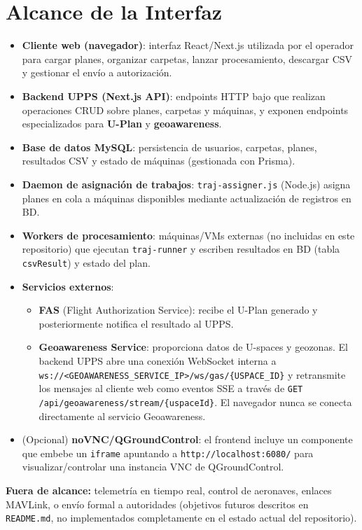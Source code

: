 \documentclass[12pt,a4paper]{article}
\newcommand{\icdendpoint}[1]{\begingroup\small\path{#1}\endgroup}
\begin{document}
\section{Alcance de la Interfaz}
\begin{itemize}
    \item \textbf{Cliente web (navegador)}: interfaz React/Next.js utilizada por el operador para cargar planes, organizar carpetas, lanzar procesamiento, descargar CSV y gestionar el envío a autorización.
    \item \textbf{Backend UPPS (Next.js API)}: endpoints HTTP bajo \icdendpoint{/api/*} que realizan operaciones CRUD sobre planes, carpetas y máquinas, y exponen endpoints especializados para \textbf{U-Plan} y \textbf{geoawareness}.
    \item \textbf{Base de datos MySQL}: persistencia de usuarios, carpetas, planes, resultados CSV y estado de máquinas (gestionada con Prisma).
    \item \textbf{Daemon de asignación de trabajos}: \texttt{traj-assigner.js} (Node.js) asigna planes en cola a máquinas disponibles mediante actualización de registros en BD.
    \item \textbf{Workers de procesamiento}: máquinas/VMs externas (no incluidas en este repositorio) que ejecutan \texttt{traj-runner} y escriben resultados en BD (tabla \texttt{csvResult}) y estado del plan.
    \item \textbf{Servicios externos}:
    \begin{itemize}
        \item \textbf{FAS} (Flight Authorization Service): recibe el U-Plan generado y posteriormente notifica el resultado al UPPS.
        \item \textbf{Geoawareness Service}: proporciona datos de U-spaces y geozonas. El backend UPPS abre una conexión WebSocket interna a \texttt{ws://<GEOAWARENESS\_SERVICE\_IP>/ws/gas/\{USPACE\_ID\}} y retransmite los mensajes al cliente web como eventos SSE a través de \texttt{GET /api/geoawareness/stream/\{uspaceId\}}. El navegador nunca se conecta directamente al servicio Geoawareness.
    \end{itemize}
    \item (Opcional) \textbf{noVNC/QGroundControl}: el frontend incluye un componente que embebe un \texttt{iframe} apuntando a \texttt{http://localhost:6080/} para visualizar/controlar una instancia VNC de QGroundControl.
\end{itemize}

\noindent\textbf{Fuera de alcance:} telemetría en tiempo real, control de aeronaves, enlaces MAVLink, o envío formal a autoridades (objetivos futuros descritos en \texttt{README.md}, no implementados completamente en el estado actual del repositorio).
\end{document}
